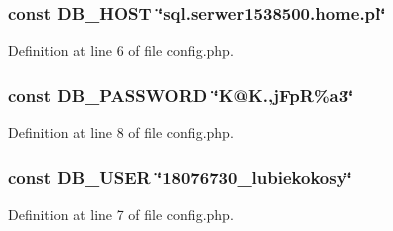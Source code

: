 \subsubsection[{D\+B\+\_\+\+H\+O\+S\+T}]{\setlength{\rightskip}{0pt plus 5cm}const D\+B\+\_\+\+H\+O\+S\+T \char`\"{}sql.\+serwer1538500.\+home.\+pl\char`\"{}}\label{copy_2config_8php_a293363d7988627f671958e2d908c202a}


Definition at line 6 of file config.\+php.

\hypertarget{copy_2config_8php_a4dca144fafcc7bd3f71cb5778afcdd13}{}
\subsubsection[{D\+B\+\_\+\+P\+A\+S\+S\+W\+O\+R\+D}]{\setlength{\rightskip}{0pt plus 5cm}const D\+B\+\_\+\+P\+A\+S\+S\+W\+O\+R\+D \char`\"{}K@K.,j\+Fp\+R\%a3\char`\"{}}\label{copy_2config_8php_a4dca144fafcc7bd3f71cb5778afcdd13}


Definition at line 8 of file config.\+php.

\hypertarget{copy_2config_8php_a1d1d99f8e08f387d84fe9848f3357156}{}
\subsubsection[{D\+B\+\_\+\+U\+S\+E\+R}]{\setlength{\rightskip}{0pt plus 5cm}const D\+B\+\_\+\+U\+S\+E\+R \char`\"{}18076730\+\_\+lubiekokosy\char`\"{}}\label{copy_2config_8php_a1d1d99f8e08f387d84fe9848f3357156}


Definition at line 7 of file config.\+php.

